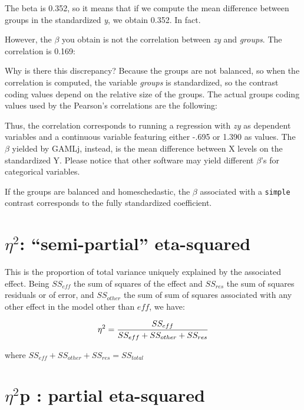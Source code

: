 \documentclass[]{article}
\begin{document}
The beta is 0.352, so it means that if we compute the mean difference
between groups in the standardized \emph{y}, we obtain 0.352. In fact.

However, the \(\beta\) you obtain is not the correlation between
\emph{zy} and \emph{groups}. The correlation is 0.169:

Why is there this discrepancy? Because the groups are not balanced, so
when the correlation is computed, the variable \emph{groups} is
standardized, so the contrast coding values depend on the relative size
of the groups. The actual groups coding values used by the Pearson's
correlations are the following:

Thus, the correlation corresponds to running a regression with \emph{zy}
as dependent variables and a continuous variable featuring either -.695
or 1.390 as values. The \(\beta\) yielded by {GAMLj}, instead, is the
mean difference between X levels on the standardized Y. Please notice
that other software may yield different \(\beta\)'s for categorical
variables.

If the groups are balanced and homeschedastic, the \(\beta\) associated
with a \texttt{simple} contrast corresponds to the fully standardized
coefficient.

\hypertarget{eta2-semi-partial-eta-squared}{%
\section{\texorpdfstring{\(\eta^2\): ``semi-partial''
eta-squared}{\textbackslash{}eta\^{}2: ``semi-partial'' eta-squared}}\label{eta2-semi-partial-eta-squared}}

This is the proportion of total variance uniquely explained by the
associated effect. Being \(SS_{eff}\) the sum of squares of the effect
and \(SS_{res}\) the sum of squares residuals or of error, and
\(SS_{other}\) the sum of sum of squares associated with any other
effect in the model other than \(eff\), we have:

\[\eta^2={{SS_{eff} \over {SS_{eff}+SS_{other}+SS_{res}}}}\]

where \(SS_{eff}+SS_{other}+SS_{res}=SS_{total}\)

\hypertarget{eta2p-partial-eta-squared}{%
\section{\texorpdfstring{\(\eta^2\)p : partial
eta-squared}{\textbackslash{}eta\^{}2p : partial eta-squared}}\label{eta2p-partial-eta-squared}}
\end{document}
